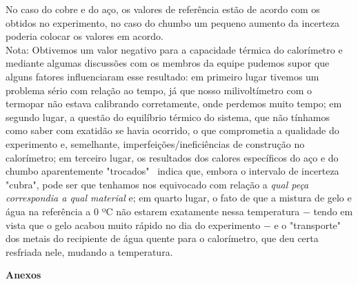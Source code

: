 \documentclass[a4paper, 12pt]{article}
\begin{document}
No caso do cobre e do aço, os valores de referência estão de acordo com os obtidos no experimento, no caso do chumbo um pequeno aumento da incerteza poderia colocar os valores em acordo.
\\

Nota: Obtivemos um valor negativo para a capacidade térmica do calorímetro e  mediante algumas discussões com os membros da equipe pudemos supor que alguns fatores influenciaram esse resultado: em primeiro lugar tivemos um problema sério com relação ao tempo, já que nosso milivoltímetro com o termopar não estava calibrando corretamente, onde perdemos muito tempo; 
em segundo lugar, a questão do equilíbrio térmico do sistema, que não tínhamos como saber com exatidão se havia ocorrido, o que comprometia a qualidade do experimento e, semelhante, imperfeições/ineficiências de construção no calorímetro; 
em terceiro lugar, os resultados dos calores específicos do aço e do chumbo aparentemente "trocados" \, indica que, embora o intervalo de incerteza "cubra", pode ser que tenhamos nos equivocado com relação a \textit{qual peça correspondia a qual material} e;
em quarto lugar, o fato de que a mistura de gelo e água na referência a 0 ºC não estarem exatamente nessa temperatura $-$ tendo em vista que o gelo acabou muito rápido no dia do experimento $-$ e o "transporte" dos metais do recipiente de água quente para o calorímetro, que deu certa resfriada nele, mudando a temperatura. 


\pagebreak


\textbf{Anexos}



\end{document}
